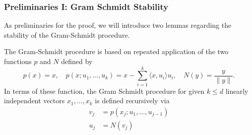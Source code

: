 \documentclass[twoside,11pt]{article}
\newcommand{\RR}{\mathbb{R}}
\newcommand{\CC}{\mathbb{C}}
\renewcommand{\align}{\mathrm{align}}
\newcommand{\fspace}{F^{inv}_{d,n,s}}
\begin{document}











\subsubsection{Preliminaries I: Gram Schmidt Stability}
As preliminaries for the proof, we will introduce two lemmas regarding the stability of the Gram-Schmidt procedure. 

The Gram-Schmidt procedure is based on repeated application of the two functions $p$ and $N$ defined by 
\begin{equation}\label{eq:Nandp}
p(x)=x, \quad p(x;u_1,\ldots,u_k)=x-\sum_{i=1}^k \langle x,u_i \rangle u_i  ,\quad
N(y)=
\frac{y}{\|y\|}.
 \end{equation}
In terms of these function, the Gram Schmidt procedure for  given $k\leq d$ linearly independent vectors $x_1,\ldots,x_k$ is defined recursively via 
\begin{align*}
v_j&=p(x_j;u_1,\ldots,u_{j-1})\\
u_j&=N(v_j)
\end{align*}
\end{document}
